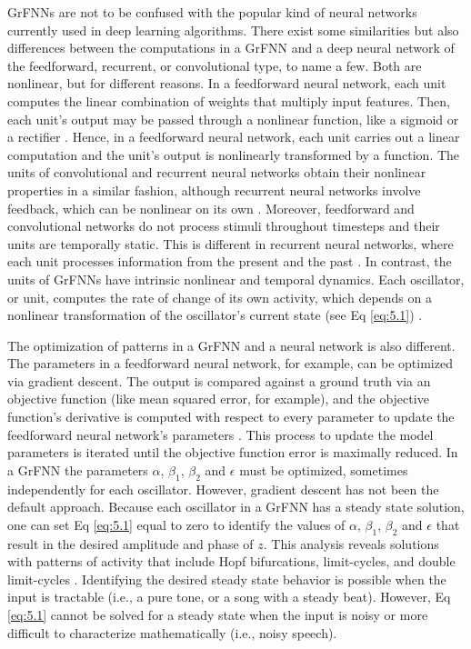 \documentclass{report}
\begin{document}
GrFNNs are not to be confused with the popular kind of neural networks currently used in deep learning algorithms. There exist some similarities but also differences between the computations in a GrFNN and a deep neural network of the feedforward, recurrent, or convolutional type, to name a few. Both are nonlinear, but for different reasons. In a feedforward neural network, each unit computes the linear combination of weights that multiply input features. Then, each unit's output may be passed through a nonlinear function, like a sigmoid or a rectifier \cite{svozil1997introduction}. Hence, in a feedforward neural network, each unit carries out a linear computation and the unit's output is nonlinearly transformed by a function. The units of convolutional and recurrent neural networks obtain their nonlinear properties in a similar fashion, although recurrent neural networks involve feedback, which can be nonlinear on its own \cite{le2015tutorial2}. Moreover, feedforward and convolutional networks do not process stimuli throughout timesteps and their units are temporally static. This is different in recurrent neural networks, where each unit processes information from the present and the past \cite{le2015tutorial2}. In contrast, the units of GrFNNs have intrinsic nonlinear and temporal dynamics. Each oscillator, or unit, computes the rate of change of its own activity, which depends on a nonlinear transformation of the oscillator's current state (see Eq \eqref{eq:5.1}) \cite{large2010canonical}. 

The optimization of patterns in a GrFNN and a neural network is also different. The parameters in a feedforward neural network, for example, can be optimized via gradient descent. The output is compared against a ground truth via an objective function (like mean squared error, for example), and the objective function's derivative is computed with respect to every parameter to update the feedforward neural network's parameters \cite{le2015tutorial1}. This process to update the model parameters is iterated until the objective function error is maximally reduced. In a GrFNN the parameters $\alpha$, $\beta_1$, $\beta_2$ and $\epsilon$ must be optimized, sometimes independently for each oscillator. However, gradient descent has not been the default approach. Because each oscillator in a GrFNN has a steady state solution, one can set Eq \eqref{eq:5.1} equal to zero to identify the values of $\alpha$, $\beta_1$, $\beta_2$ and $\epsilon$ that result in the desired amplitude and phase of $z$. This analysis reveals solutions with patterns of activity that include Hopf bifurcations, limit-cycles, and double limit-cycles \cite{kim2015signal}. Identifying the desired steady state behavior is possible when the input is tractable (i.e., a pure tone, or a song with a steady beat). However, Eq \eqref{eq:5.1} cannot be solved for a steady state when the input is noisy or more difficult to characterize mathematically (i.e., noisy speech). 
\end{document}
